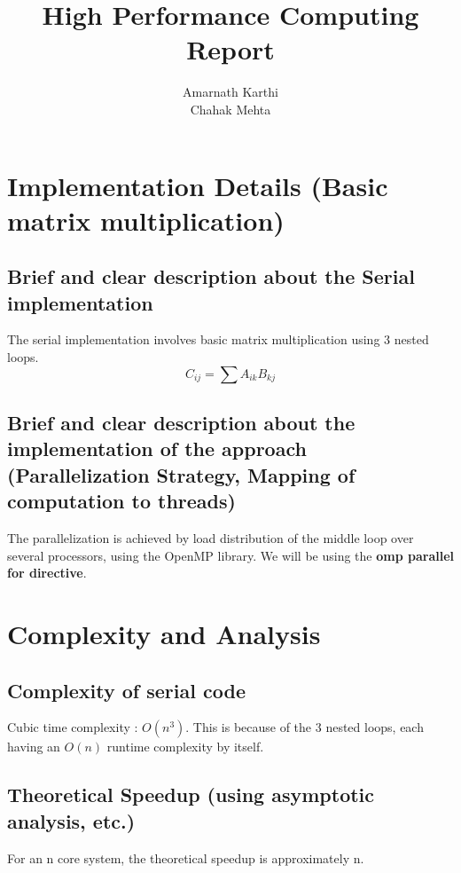 \documentclass[runningheads, a4paper, oribibl]{llncs}
\begin{document}
\mainmatter

\title{High Performance Computing Report}


\author{Amarnath Karthi\\Chahak Mehta}%
%

\maketitle
\section{Implementation Details (Basic matrix multiplication)}
\subsection{Brief and clear description about the Serial implementation}
The serial implementation involves basic matrix multiplication using 3 nested loops.
\begin{equation}
    C_{ij} = \sum A_{ik}B_{kj}
\end{equation}
\subsection{Brief and clear description about the implementation of the approach (Parallelization Strategy, Mapping of computation to threads)}
The parallelization is achieved by load distribution of the middle loop over several processors, using the OpenMP library. We will be using the \textbf{omp parallel for directive}.
\section{Complexity and Analysis}
\subsection{Complexity of serial code}
Cubic time complexity : $O(n^3)$.
This is because of the 3 nested loops, each having an $O(n)$ runtime complexity by itself.
\subsection{Theoretical Speedup (using asymptotic analysis, etc.)}
For an n core system, the theoretical speedup is approximately n.
\newpage
\end{document}

